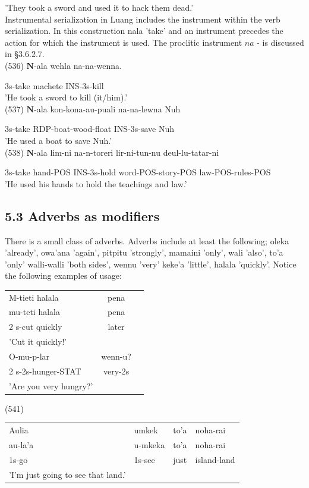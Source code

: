 \documentclass[10pt]{article}
\begin{document}
'They took a sword and used it to hack them dead.'\\
Instrumental serialization in Luang includes the instrument within the verb serialization. In this construction nala 'take' and an instrument precedes the action for which the instrument is used. The proclitic instrument \(n a\) - is discussed in §3.6.2.7.\\
(536) \(\boldsymbol{N}\)-ala wehla na-na-wenna.

3s-take machete INS-3s-kill\\
'He took a sword to kill (it/him).'\\
(537) \(\boldsymbol{N}\)-ala kon-kona-au-puali na-na-lewna Nuh

3s-take RDP-boat-wood-float INS-3s-save Nuh\\
'He used a boat to save Nuh.'\\
(538) \(\boldsymbol{N}\)-ala lim-ni na-n-toreri lir-ni-tun-nu deul-lu-tatar-ni

3s-take hand-POS INS-3s-hold word-POS-story-POS law-POS-rules-POS\\
'He used his hands to hold the teachings and law.'

\subsection*{5.3 Adverbs as modifiers}
There is a small class of adverbs. Adverbs include at least the following; oleka 'already', owa'ana 'again', pitpitu 'strongly', mamaini 'only', wali 'also', to'a 'only' walli-walli 'both sides', wennu 'very' keke'a 'little', halala 'quickly'. Notice the following examples of usage:

\begin{center}
\begin{tabular}{lcc}
M-tieti halala & pena \\
mu-teti halala & pena \\
2 s-cut quickly & later \\
'Cut it quickly!' &  \\
O-mu-p-lar & wenn-u? \\
2 s-2s-hunger-STAT & very-2s \\
'Are you very hungry?' &  \\
\end{tabular}
\end{center}

(541)

\begin{center}
\begin{tabular}{llll}
Aulia & umkek & to'a & noha-rai \\
au-la'a & u-mkeka & to'a & noha-rai \\
1s-go & 1s-see & just & island-land \\
'I'm just going to see that land.' &  &  &  \\
\end{tabular}
\end{center}
\end{document}

